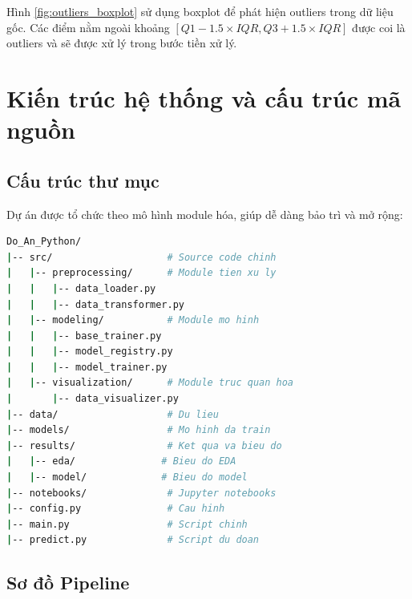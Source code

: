 \documentclass[12pt,a4paper]{article}
\begin{document}
Hình \ref{fig:outliers_boxplot} sử dụng boxplot để phát hiện outliers trong dữ liệu gốc. Các điểm nằm ngoài khoảng $[Q1 - 1.5 \times IQR, Q3 + 1.5 \times IQR]$ được coi là outliers và sẽ được xử lý trong bước tiền xử lý.

\section{Kiến trúc hệ thống và cấu trúc mã nguồn}

\subsection{Cấu trúc thư mục}

Dự án được tổ chức theo mô hình module hóa, giúp dễ dàng bảo trì và mở rộng:

\begin{lstlisting}[language=bash, caption={Cấu trúc thư mục dự án}]
Do_An_Python/
|-- src/                    # Source code chinh
|   |-- preprocessing/      # Module tien xu ly
|   |   |-- data_loader.py
|   |   |-- data_transformer.py
|   |-- modeling/           # Module mo hinh
|   |   |-- base_trainer.py
|   |   |-- model_registry.py
|   |   |-- model_trainer.py
|   |-- visualization/      # Module truc quan hoa
|       |-- data_visualizer.py
|-- data/                   # Du lieu
|-- models/                 # Mo hinh da train
|-- results/                # Ket qua va bieu do
|   |-- eda/               # Bieu do EDA
|   |-- model/             # Bieu do model
|-- notebooks/              # Jupyter notebooks
|-- config.py               # Cau hinh
|-- main.py                 # Script chinh
|-- predict.py              # Script du doan
\end{lstlisting}

\subsection{Sơ đồ Pipeline}
\end{document}
